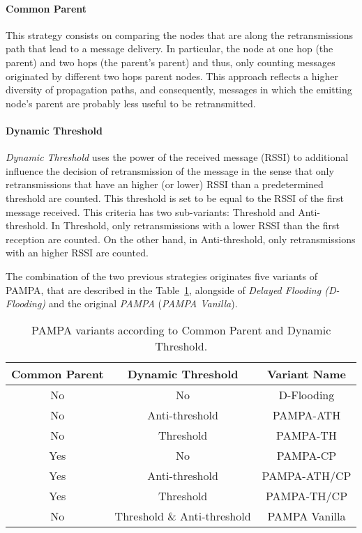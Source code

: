 \documentclass[conference]{IEEEtran}
\begin{document}
\paragraph{Common Parent}
This strategy consists on comparing the nodes that are along the retransmissions path that lead to a message delivery. In particular, the node at one hop (the parent) and two hops (the parent's parent) and thus, only counting messages originated by different two hops parent nodes. This approach reflects a higher diversity of propagation paths, and consequently, messages in which the emitting node's parent are probably less useful to be retransmitted.

\paragraph{Dynamic Threshold}
\emph{Dynamic Threshold} uses the power of the received message (RSSI) to additional influence the decision of retransmission of the message in the sense that only retransmissions that have an higher (or lower) RSSI than a predetermined threshold are counted. This threshold is set to be equal to the RSSI of the first message received. This criteria has two sub-variants: Threshold and Anti-threshold. In Threshold, only retransmissions with a lower RSSI than the first reception are counted. On the other hand, in Anti-threshold, only retransmissions with an higher RSSI are counted.

The combination of the two previous strategies originates five variants of PAMPA, that are described in the Table~\ref{tab1}, alongside of \emph{Delayed Flooding (D-Flooding)} and the original \emph{PAMPA} (\emph{PAMPA Vanilla}).

\begin{table}
  \center
\caption{PAMPA variants according to Common Parent and Dynamic Threshold.}\label{tab1}
\begin{tabular}{|c|c|c|}
\hline
Common Parent & Dynamic Threshold & Variant Name\\
\hline
No & No & D-Flooding \\
No & Anti-threshold & PAMPA-ATH\\
No & Threshold & PAMPA-TH\\
Yes & No & PAMPA-CP\\
Yes & Anti-threshold & PAMPA-ATH/CP\\ %
Yes & Threshold & PAMPA-TH/CP\\
No & Threshold \& Anti-threshold & PAMPA Vanilla\\
\hline
\end{tabular}
\end{table}
\end{document}
